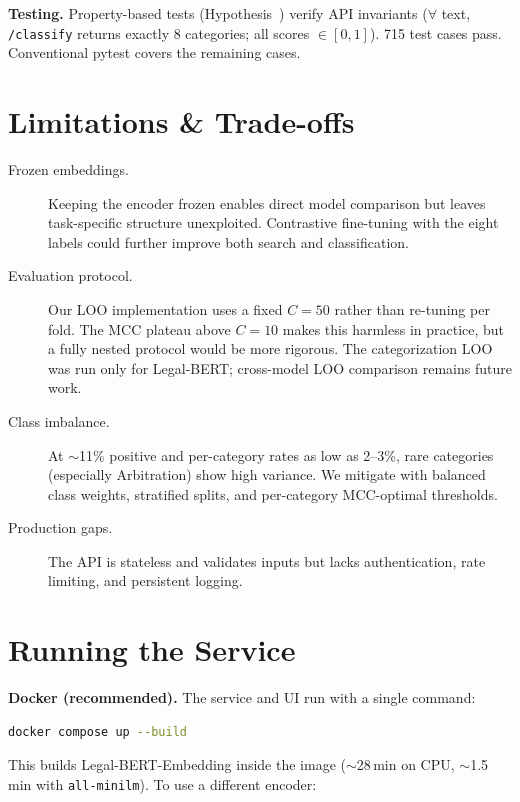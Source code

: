\documentclass[11pt,a4paper]{article}
\begin{document}
\textbf{Testing.}  Property-based tests (Hypothesis~\cite{hypothesis})
verify API invariants ($\forall$ text, \texttt{/classify} returns exactly
8 categories; all scores $\in [0,1]$).  715 test cases pass.  Conventional
pytest covers the remaining cases.

\section{Limitations \& Trade-offs}

\begin{description}
\item[Frozen embeddings.]  Keeping the encoder frozen enables direct model
  comparison but leaves task-specific structure unexploited.  Contrastive
  fine-tuning with the eight labels could further improve both search and
  classification.
\item[Evaluation protocol.]  Our LOO implementation uses a fixed $C=50$
  rather than re-tuning per fold.  The MCC plateau above $C=10$ makes this
  harmless in practice, but a fully nested protocol would be more rigorous.
  The categorization LOO was run only for Legal-BERT; cross-model LOO
  comparison remains future work.
\item[Class imbalance.]  At $\sim$11\% positive and per-category rates as
  low as 2--3\%, rare categories (especially Arbitration) show high
  variance.  We mitigate with balanced class weights,
  stratified splits, and per-category MCC-optimal thresholds.
\item[Production gaps.]  The API is stateless and validates inputs but
  lacks authentication, rate limiting, and persistent logging.
\end{description}

\section{Running the Service}\label{sec:running}

\textbf{Docker (recommended).}  The service and UI run with a single
command:

\begin{lstlisting}[language=bash]
docker compose up --build
\end{lstlisting}

This builds Legal-BERT-Embedding inside the image ($\sim$28\,min on CPU,
$\sim$1.5\,min with \texttt{all-minilm}).  To use a different encoder:
\end{document}
